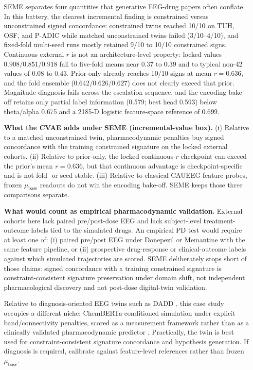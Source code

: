 SEME separates four quantities that generative EEG-drug papers often conflate. In this battery, the clearest incremental finding is constrained versus unconstrained signed concordance: constrained twins reached 10/10 on TUH, OSF, and P-ADIC while matched unconstrained twins failed (3/10--4/10), and fixed-fold multi-seed runs mostly retained 9/10 to 10/10 constrained signs. Continuous external \(r\) is not an architecture-level property: locked values \(0.908/0.851/0.918\) fall to five-fold means near 0.37 to 0.39 and to typical non-42 values of 0.08 to 0.43. Prior-only already reaches 10/10 signs at mean \(r=0.636\), and the fold ensemble (\(0.642/0.626/0.627\)) does not clearly exceed that prior. Magnitude diagnosis fails across the escalation sequence, and the encoding bake-off retains only partial label information (0.579; best head 0.593) below theta/alpha 0.675 and a 2185-D logistic feature-space reference of 0.699.

\textbf{What the CVAE adds under SEME (incremental-value box).} (i) Relative to a matched unconstrained twin, pharmacodynamic penalties buy signed concordance with the training constrained signature on the locked external cohorts. (ii) Relative to prior-only, the locked continuous-\(r\) checkpoint can exceed the prior's mean \(r=0.636\), but that continuous advantage is checkpoint-specific and is not fold- or seed-stable. (iii) Relative to classical CAUEEG feature probes, frozen \(\mu_{\mathrm{base}}\) readouts do not win the encoding bake-off. SEME keeps those three comparisons separate.

\textbf{What would count as empirical pharmacodynamic validation.} External cohorts here lack paired pre/post-dose EEG and lack subject-level treatment-outcome labels tied to the simulated drugs. An empirical PD test would require at least one of: (i) paired pre/post EEG under Donepezil or Memantine with the same feature pipeline, or (ii) prospective drug-response or clinical-outcome labels against which simulated trajectories are scored. SEME deliberately stops short of those claims: signed concordance with a training constrained signature is constraint-consistent signature preservation under domain shift, not independent pharmacological discovery and not post-dose digital-twin validation.

Relative to diagnosis-oriented EEG twins such as DADD \citep{Amato2025DADD,Amato2026DADDnpj}, this case study occupies a different niche: ChemBERTa-conditioned simulation under explicit band/connectivity penalties, scored as a measurement framework rather than as a clinically validated pharmacodynamic predictor \citep{CorralAcero2020DigitalTwin}. Practically, the twin is best used for constraint-consistent signature concordance and hypothesis generation. If diagnosis is required, calibrate against feature-level references rather than frozen \(\mu_{\mathrm{base}}\).

